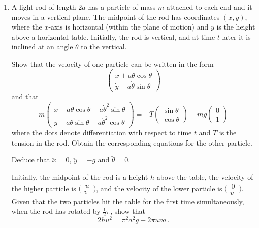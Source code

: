 \documentclass[a4, 11pt]{report}
\newlength{\qspace}
\newcounter{qnumber}
\newenvironment{question}%
 {\vspace{\qspace}
  \begin{enumerate}[\bfseries 1\quad][10]%
    \setcounter{enumi}{\value{qnumber}}%
    \item%
 }
{
  \end{enumerate}
  \filbreak
  \stepcounter{qnumber}
 }
\renewcommand{\.}[1]{\ensuremath{\mathrm{#1}}}
\newcommand{\+}[1]{\ensuremath{\mathbf{#1}}}
\begin{document}
\begin{question}	
A light rod of length $2a$ has a particle of mass $m$ attached to each end and it moves in  a vertical plane. The midpoint of the rod has coordinates $(x,y)$, where the $x$-axis is horizontal (within the plane of motion) and $y$ is the height above a horizontal table. Initially, the rod is vertical, and at time $t$ later it is inclined at an angle $\theta$ to the vertical.

Show that the velocity of one particle can be written in the form
\[
\begin{pmatrix}
\dot x + a \dot\theta \cos\theta  \\
 \dot y - a \dot\theta \sin\theta
\end{pmatrix}
\]
and that 
\[
m\begin{pmatrix}
 \ddot x + a\ddot\theta \cos\theta - a \dot\theta^2 \sin\theta 
\\
 \ddot y- a\ddot\theta \sin\theta - a \dot\theta^2 \cos\theta  
\end{pmatrix}
=-T\begin{pmatrix}

 \sin\theta
\\
\cos\theta
\end{pmatrix}
-mg
\begin{pmatrix}
0 \\ 1
\end{pmatrix}
\]
where the dots denote differentiation with respect to time $t$ and $T$ is the tension in the rod.  Obtain the corresponding equations for the other particle.

Deduce that $\ddot x =0$, $\ddot y = -g$ and $\ddot\theta =0$.

Initially, the  midpoint of the rod is a height $h$ above the table, the velocity   of the higher particle is $\Big(\begin{matrix} \, u \, \\ v \end{matrix}\Big)$, and the velocity of the lower particle is $\Big(\begin{matrix}\, 0  \, \\ v\end{matrix}\Big)$. Given that the two  particles hit the table for the first time simultaneously, when the rod has rotated by $\frac12\pi$, show that
\[
2hu^2 = \pi^2a^2 g - 2\pi uva \,.
\]
\end{question}

\end{document}
